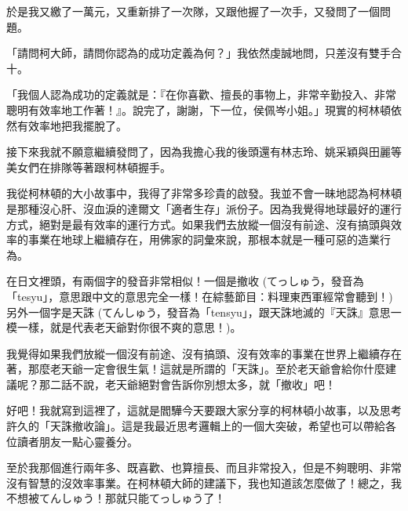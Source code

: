 於是我又繳了一萬元，又重新排了一次隊，又跟他握了一次手，又發問了一個問題。

「請問柯大師，請問你認為的成功定義為何？」我依然虔誠地問，只差沒有雙手合十。

「我個人認為成功的定義就是：『在你喜歡、擅長的事物上，非常辛勤投入、非常聰明有效率地工作著！』。說完了，謝謝，下一位，侯佩岑小姐。」現實的柯林頓依然有效率地把我擺脫了。

接下來我就不願意繼續發問了，因為我擔心我的後頭還有林志玲、姚采穎與田麗等美女們在排隊等著跟柯林頓握手。

我從柯林頓的大小故事中，我得了非常多珍貴的啟發。我並不會一昧地認為柯林頓是那種沒心肝、沒血淚的達爾文「適者生存」派份子。因為我覺得地球最好的運行方式，絕對是最有效率的運行方式。如果我們去放縱一個沒有前途、沒有搞頭與效率的事業在地球上繼續存在，用佛家的詞彙來說，那根本就是一種可惡的造業行為。

在日文裡頭，有兩個字的發音非常相似！一個是撤收 (てっしゅう，發音為「tesyu」，意思跟中文的意思完全一樣！在綜藝節目：料理東西軍經常會聽到！) 另外一個字是天誅 (てんしゅう，發音為「tensyu」，跟天誅地滅的『天誅』意思一模一樣，就是代表老天爺對你很不爽的意思！)。

我覺得如果我們放縱一個沒有前途、沒有搞頭、沒有效率的事業在世界上繼續存在著，那麼老天爺一定會很生氣！這就是所謂的「天誅」。至於老天爺會給你什麼建議呢？那二話不說，老天爺絕對會告訴你別想太多，就「撤收」吧！

好吧！我就寫到這裡了，這就是閻驊今天要跟大家分享的柯林頓小故事，以及思考許久的「天誅撤收論」。這是我最近思考邏輯上的一個大突破，希望也可以帶給各位讀者朋友一點心靈養分。

至於我那個進行兩年多、既喜歡、也算擅長、而且非常投入，但是不夠聰明、非常沒有智慧的沒效率事業。在柯林頓大師的建議下，我也知道該怎麼做了！總之，我不想被てんしゅう！那就只能てっしゅう了！
 
 